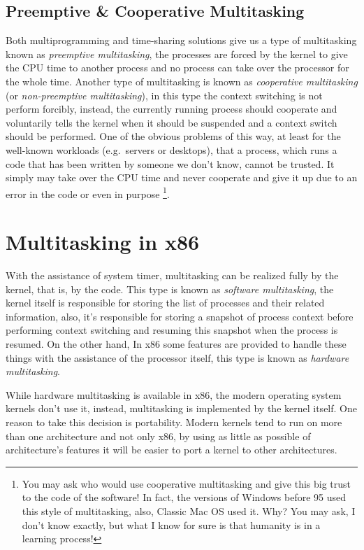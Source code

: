 \subsection{Preemptive \& Cooperative
Multitasking}\label{preemptive-cooperative-multitasking}

Both multiprogramming and time-sharing solutions give us a type of
multitasking known as \emph{preemptive multitasking}, the processes are
forced by the kernel to give the CPU time to another process and no
process can take over the processor for the whole time. Another type of
multitasking is known as \emph{cooperative multitasking} (or
\emph{non-preemptive multitasking}), in this type the context switching
is not perform forcibly, instead, the currently running process should
cooperate and voluntarily tells the kernel when it should be suspended
and a context switch should be performed. One of the obvious problems of
this way, at least for the well-known workloads (e.g.~servers or
desktops), that a process, which runs a code that has been written by
someone we don't know, cannot be trusted. It simply may take over the
CPU time and never cooperate and give it up due to an error in the code
or even in purpose \footnote{You may ask who would use cooperative
  multitasking and give this big trust to the code of the software! In
  fact, the versions of Windows before 95 used this style of
  multitasking, also, Classic Mac OS used it. Why? You may ask, I don't
  know exactly, but what I know for sure is that humanity is in a
  learning process!}.

\section{Multitasking in x86}\label{multitasking-in-x86}

With the assistance of system timer, multitasking can be realized fully
by the kernel, that is, by the code. This type is known as
\emph{software multitasking}, the kernel itself is responsible for
storing the list of processes and their related information, also, it's
responsible for storing a snapshot of process context before performing
context switching and resuming this snapshot when the process is
resumed. On the other hand, In x86 some features are provided to handle
these things with the assistance of the processor itself, this type is
known as \emph{hardware multitasking}.

While hardware multitasking is available in x86, the modern operating
system kernels don't use it, instead, multitasking is implemented by the
kernel itself. One reason to take this decision is portability. Modern
kernels tend to run on more than one architecture and not only x86, by
using as little as possible of architecture's features it will be easier
to port a kernel to other architectures.

